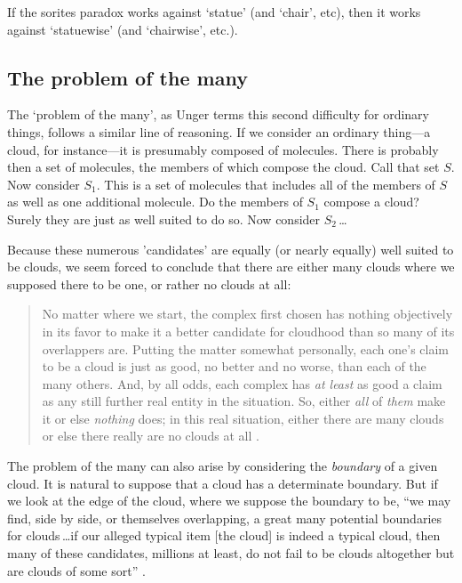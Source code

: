 \documentclass[11pt]{standalone} \newif\ifstandlone \standalonetrue
\newenvironment{squote}{%
	\begin{quote}\begin{singlespace}%
	}{%
	\end{singlespace}\end{quote}}
\begin{document}
\begin{spacing}{1.5}
If the sorites paradox works against `statue' (and `chair', etc), then
it works against `statuewise' (and `chairwise', etc.).

\subsection{The problem of the many}
\label{many}
The `problem of the many', as Unger terms this second difficulty for
ordinary things, follows a similar line of reasoning.  If we consider
an ordinary thing---a cloud, for instance---it is presumably composed
of molecules.  There is probably then a set of molecules, the members
of which compose the cloud.  Call that set $S$.  Now consider $S_1$.
This is a set of molecules that includes all of the members of $S$ as
well as one additional molecule.  Do the members of $S_1$ compose a
cloud?  Surely they are just as well suited to do so.  Now consider
$S_2$\,\ldots

Because these numerous 'candidates' are equally (or nearly equally)
well suited to be clouds, we seem forced to conclude that there are
either many clouds where we supposed there to be one, or rather no
clouds at all:

\begin{squote}
No matter where we start, the complex first chosen has nothing
objectively in its favor to make it a better candidate for cloudhood
than so many of its overlappers are.  Putting the matter somewhat
personally, each one's claim to be a cloud is just as good, no better
and no worse, than each of the many others.  And, by all odds, each
complex has \emph{at least} as good a claim as any still further real
entity in the situation.  So, either \emph{all} of \emph{them} make it
or else \emph{nothing} does; in this real situation, either there are
many clouds or else there really are no clouds at all
\citep[415--??]{unger1980a}.
\end{squote}

The problem of the many can also arise by considering the {\em
  boundary} of a given cloud.  It is natural to suppose that a cloud
has a determinate boundary.  But if we look at the edge of the cloud,
where we suppose the boundary to be, ``we may find, side by side, or
themselves overlapping, a great many potential boundaries for
clouds\,\ldots if our alleged typical item {[}the cloud{]} is indeed
a typical cloud, then many of these candidates, millions at least, do
not fail to be clouds altogether but are clouds of some
sort'' \citep[420--421]{unger1980a}.


\end{spacing}
\end{document}
